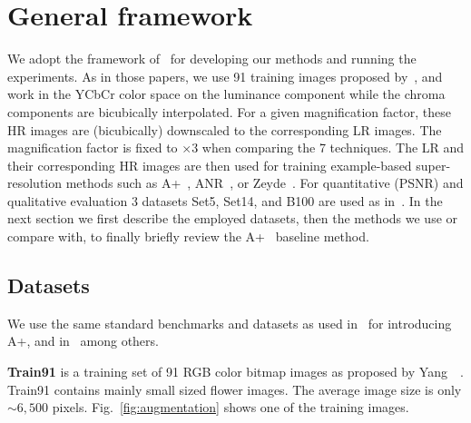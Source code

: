 \documentclass[10pt,twocolumn,letterpaper]{article}
\begin{document}

\section{General framework}
\label{sec:framework}
We adopt the framework of~\cite{Timofte-ICCV-2013,Timofte-ACCV-2014} for developing our methods and running the experiments. 
As in those papers, we use 91 training images proposed by~\cite{Yang-CVPR-2008}, and work in the YCbCr color space on the luminance component while the chroma components are bicubically interpolated.
For a given magnification factor, these HR images are (bicubically) downscaled to the corresponding LR images. The magnification factor is fixed to $\times3$ when comparing the 7 techniques. 
The LR and their corresponding HR images are then used for training example-based super-resolution methods such as A+~\cite{Timofte-ACCV-2014}, ANR~\cite{Timofte-ICCV-2013},
or Zeyde~\cite{Zeyde-CS-2012}. For quantitative (PSNR) and qualitative evaluation 3 datasets Set5, Set14, and B100 are used as in~\cite{Timofte-ACCV-2014}.
In the next section we first describe the employed datasets, then the methods we use or compare with, to finally briefly review the A+~\cite{Timofte-ACCV-2014} baseline method.

\subsection{Datasets}
\label{ssc:datasets}
We use the same standard benchmarks and datasets as used in~\cite{Timofte-ACCV-2014} for introducing A+, and in~\cite{Yang-CVPR-2008, Zeyde-CS-2012, Timofte-ICCV-2013, Perez-ACCV-2014, Dong-ECCV-2014, Schulter-CVPR-2015, Dong-PAMI-2015} among others.

\noindent\textbf{Train91 } is a training set of 91 RGB color bitmap images as proposed by Yang~\etal~\cite{Yang-CVPR-2008}. Train91 contains mainly small sized flower images. The average image size is only $\sim6,500$ pixels.
Fig.~\ref{fig:augmentation} shows one of the training images.
\end{document}
